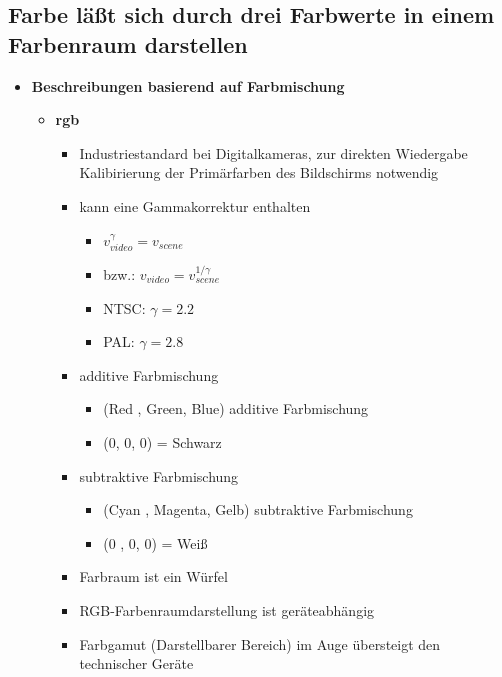 \documentclass[11pt]{article}
\begin{document}
\subsection{Farbe läßt sich durch drei Farbwerte in einem Farbenraum darstellen}
\begin{itemize}
    \item \textbf{Beschreibungen basierend auf Farbmischung}
    \begin{itemize}
        \item \textbf{rgb}
        \begin{itemize}
            \item Industriestandard bei Digitalkameras, zur direkten Wiedergabe Kalibirierung der Primärfarben des Bildschirms notwendig
            \item kann eine Gammakorrektur enthalten
            \begin{itemize}
                \item $v_{video}^{\gamma} = v_{scene}$
                \item bzw.: $v_{video} = v_{scene}^{1/\gamma}$
                \item NTSC: $\gamma = 2.2$
                \item PAL:   $\gamma = 2.8$
            \end{itemize}
            \item additive Farbmischung
                \begin{itemize}
                    \item (Red , Green, Blue) additive Farbmischung
                    \item (0, 0, 0) = Schwarz
                \end{itemize}
            \item subtraktive Farbmischung
                \begin{itemize}
                    \item (Cyan , Magenta, Gelb) subtraktive Farbmischung
                    \item (0 , 0, 0) = Weiß
                \end{itemize}
            \item Farbraum ist ein Würfel
            \item RGB-Farbenraumdarstellung ist geräteabhängig
            \item Farbgamut (Darstellbarer Bereich) im Auge übersteigt den technischer Geräte
            
        \end{itemize}


\end{itemize}
\end{itemize}
\end{document}
